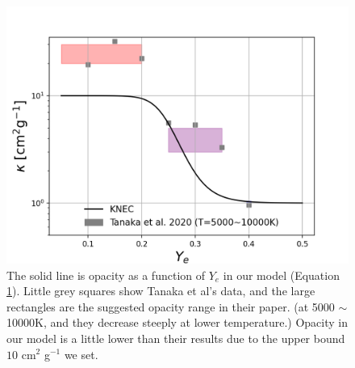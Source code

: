 \documentclass[fleqn,usenatbib]{mnras}
\begin{document}
    
    \begin{figure}
    \centering
    \includegraphics[scale=0.5]{figures/opacity_Ye.png}
    \caption{The solid line is opacity as a function of $Y_e$ in our model  (Equation \ref{opacity_Ye}). Little grey squares show Tanaka et al's data, and the large rectangles are the suggested opacity range in their paper. (at 5000 $\sim$ 10000K, and they decrease steeply at lower temperature.) Opacity in our model is a little lower than their results due to the upper bound $10$ cm$^2$ g$^{-1}$ we set.}
    \label{opacity_Ye}
    \end{figure} 
    


    
    
    
\end{document}
